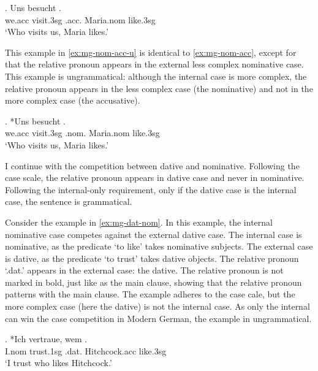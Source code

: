 \exg. Uns besucht   .\\
 we.\ac{acc} visit.3\ac{sg}\scsub{[nom]} .\ac{acc}. Maria.\ac{nom} like.3\ac{sg}\scsub{[acc]}\\
 `Who visits us, Maria likes.' \label{ex:mg-nom-acc}

This example in \ref{ex:mg-nom-acc-u} is identical to \ref{ex:mg-nom-acc}, except for that the relative pronoun appears in the external less complex nominative case. This example is ungrammatical: although the internal case is more complex, the relative pronoun appears in the less complex case (the nominative) and not in the more complex case (the accusative).

\exg. *Uns besucht   .\\
 we.\ac{acc} visit.3\ac{sg}\scsub{[nom]} .\ac{nom}. Maria.\ac{nom} like.3\ac{sg}\scsub{[acc]}\\
 `Who visits us, Maria likes.' \label{ex:mg-nom-acc-u}

I continue with the competition between dative and nominative. Following the case scale, the relative pronoun appears in dative case and never in nominative. Following the internal-only requirement, only if the dative case is the internal case, the sentence is grammatical.

Consider the example in \ref{ex:mg-dat-nom}. In this example, the internal nominative case competes against the external dative case.
The internal case is nominative, as the predicate  `to like' takes nominative subjects.
The external case is dative, as the predicate  `to trust' takes dative objects.
The relative pronoun  `.\ac{dat}.' appears in the external case: the dative. The relative pronoun is not marked in bold, just like as the main clause, showing that the relative pronoun patterns with the main clause.
The example adheres to the case cale, but the more complex case (here the dative) is not the internal case. As only the internal can win the case competition in Modern German, the example in ungrammatical.

\exg. *Ich vertraue, wem  .\\
I.\ac{nom} trust.1\ac{sg}\scsub{[dat]} .\ac{dat}. Hitchcock.\ac{acc} like.3\ac{sg}\scsub{[nom]}\\
`I trust who likes Hitchcock.' \label{ex:mg-dat-nom}

